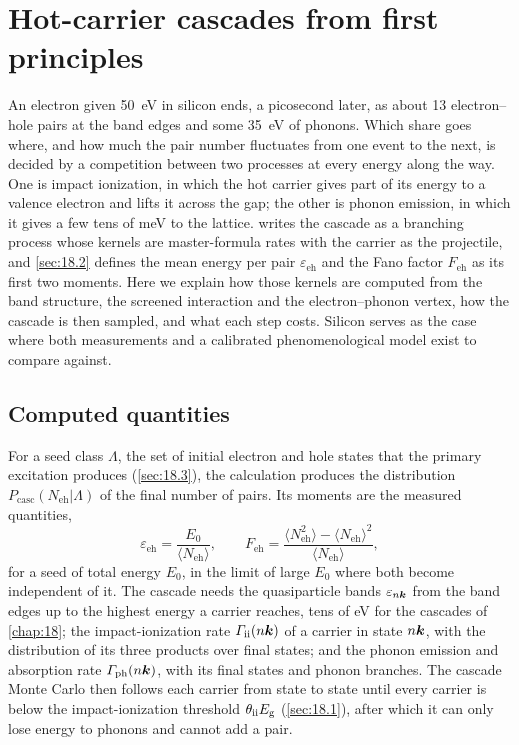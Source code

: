 \section{Hot-carrier cascades from first principles}\label{app:E.13}

An electron given \SI{50}{eV} in silicon ends, a picosecond later, as about 13 electron--hole pairs at the band edges and some \SI{35}{eV} of phonons. Which share goes where, and how much the pair number fluctuates from one event to the next, is decided by a competition between two processes at every energy along the way. One is impact ionization, in which the hot carrier gives part of its energy to a valence electron and lifts it across the gap; the other is phonon emission, in which it gives a few tens of meV to the lattice.  writes the cascade as a branching process whose kernels are master-formula rates with the carrier as the projectile, and \cref{sec:18.2} defines the mean energy per pair $\varepsilon_{\mathrm{eh}}$ and the Fano factor $F_{\mathrm{eh}}$ as its first two moments. Here we explain how those kernels are computed from the band structure, the screened interaction and the electron--phonon vertex, how the cascade is then sampled, and what each step costs. Silicon serves as the case where both measurements and a calibrated phenomenological model exist to compare against.

\subsection{Computed quantities}

For a seed class $\Lambda$, the set of initial electron and hole states that the primary excitation produces (\cref{sec:18.3}), the calculation produces the distribution $P_{\mathrm{casc}}(N_{\mathrm{eh}}|\Lambda)$ of the final number of pairs. Its moments are the measured quantities,
\begin{equation}
  \varepsilon_{\mathrm{eh}} = \frac{E_0}{\langle N_{\mathrm{eh}}\rangle}, \qquad
  F_{\mathrm{eh}} = \frac{\langle N_{\mathrm{eh}}^2\rangle - \langle N_{\mathrm{eh}}\rangle^2}{\langle N_{\mathrm{eh}}\rangle},
  \label{eq:E.13-moments}
\end{equation}
for a seed of total energy $E_0$, in the limit of large $E_0$ where both become independent of it. The cascade needs the quasiparticle bands $\varepsilon_{n\bm{k}}$ from the band edges up to the highest energy a carrier reaches, tens of eV for the cascades of \cref{chap:18}; the impact-ionization rate $\varGamma_{\mathrm{ii}}(n\bm{k})$ of a carrier in state $n\bm{k}$, with the distribution of its three products over final states; and the phonon emission and absorption rate $\varGamma_{\mathrm{ph}}(n\bm{k})$, with its final states and phonon branches. The cascade Monte Carlo then follows each carrier from state to state until every carrier is below the impact-ionization threshold $\theta_{\mathrm{ii}}E_{\mathrm{g}}$ (\cref{sec:18.1}), after which it can only lose energy to phonons and cannot add a pair.

